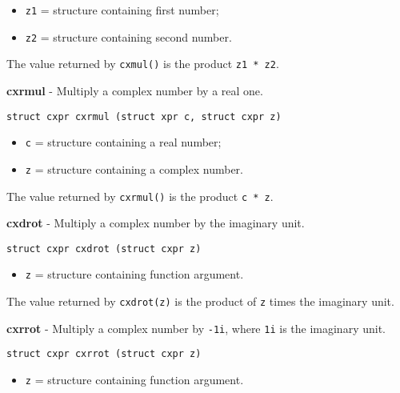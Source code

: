 \documentclass{article}
\begin{document}
\begin{itemize}
\item \texttt{z1} = structure containing first number;
\item \texttt{z2} = structure containing second number.
\end{itemize}

The value returned by \texttt{cxmul()} is the
product \texttt{z1 * z2}.


\hrulefill{}

\textbf{cxrmul} - Multiply a complex number by a real one.

\begin{verbatim}
struct cxpr cxrmul (struct xpr c, struct cxpr z)
\end{verbatim}

\begin{itemize}
\item \texttt{c} = structure containing a real number;
\item \texttt{z} = structure containing a complex number.
\end{itemize}

The value returned by \texttt{cxrmul()} is the
product \texttt{c * z}.


\hrulefill{}

\textbf{cxdrot} - Multiply a complex number by the imaginary unit.

\begin{verbatim}
struct cxpr cxdrot (struct cxpr z)
\end{verbatim}

\begin{itemize}
\item \texttt{z} = structure containing function argument.
\end{itemize}

The value returned by \texttt{cxdrot(z)} is the product of
\texttt{z} times the imaginary unit.


\hrulefill{}

\textbf{cxrrot} - Multiply a complex number by \texttt{-1i}, where 
\texttt{1i} is the imaginary unit.

\begin{verbatim}
struct cxpr cxrrot (struct cxpr z)
\end{verbatim}

\begin{itemize}
\item \texttt{z} = structure containing function argument.
\end{itemize}
\end{document}
